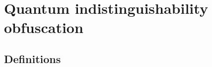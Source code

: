 \documentclass[11pt]{article}
\numberwithin{equation}{section}
\newtheorem{definition}{Definition}
\begin{document}
{%
%
%





%
%
%


\section{Quantum indistinguishability obfuscation}\label{sec:indistinguishability}

\subsection{Definitions}

}
\end{document}
